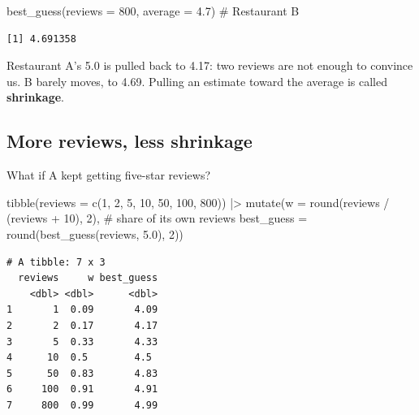 \documentclass[
  letterpaper,
  DIV=11,
  numbers=noendperiod]{scrartcl}
\newenvironment{Shaded}{\begin{snugshade}}{\end{snugshade}}
\newcommand{\AttributeTok}[1]{\textcolor[rgb]{0.40,0.45,0.13}{#1}}
\newcommand{\CommentTok}[1]{\textcolor[rgb]{0.37,0.37,0.37}{#1}}
\newcommand{\DecValTok}[1]{\textcolor[rgb]{0.68,0.00,0.00}{#1}}
\newcommand{\FloatTok}[1]{\textcolor[rgb]{0.68,0.00,0.00}{#1}}
\newcommand{\FunctionTok}[1]{\textcolor[rgb]{0.28,0.35,0.67}{#1}}
\newcommand{\NormalTok}[1]{\textcolor[rgb]{0.00,0.23,0.31}{#1}}
\newcommand{\SpecialCharTok}[1]{\textcolor[rgb]{0.37,0.37,0.37}{#1}}
\begin{document}
\begin{Shaded}
\begin{Highlighting}[]
\FunctionTok{best\_guess}\NormalTok{(}\AttributeTok{reviews =} \DecValTok{800}\NormalTok{, }\AttributeTok{average =} \FloatTok{4.7}\NormalTok{)        }\CommentTok{\# Restaurant B}
\end{Highlighting}
\end{Shaded}

\begin{verbatim}
[1] 4.691358
\end{verbatim}

Restaurant A's 5.0 is pulled back to 4.17: two reviews are not enough to
convince us. B barely moves, to 4.69. Pulling an estimate toward the
average is called \textbf{shrinkage}.

\subsection{More reviews, less
shrinkage}\label{more-reviews-less-shrinkage}

What if A kept getting five-star reviews?

\begin{Shaded}
\begin{Highlighting}[]
\FunctionTok{tibble}\NormalTok{(}\AttributeTok{reviews =} \FunctionTok{c}\NormalTok{(}\DecValTok{1}\NormalTok{, }\DecValTok{2}\NormalTok{, }\DecValTok{5}\NormalTok{, }\DecValTok{10}\NormalTok{, }\DecValTok{50}\NormalTok{, }\DecValTok{100}\NormalTok{, }\DecValTok{800}\NormalTok{)) }\SpecialCharTok{|\textgreater{}}
  \FunctionTok{mutate}\NormalTok{(}\AttributeTok{w          =} \FunctionTok{round}\NormalTok{(reviews }\SpecialCharTok{/}\NormalTok{ (reviews }\SpecialCharTok{+} \DecValTok{10}\NormalTok{), }\DecValTok{2}\NormalTok{),   }\CommentTok{\# share of its own reviews}
         \AttributeTok{best\_guess =} \FunctionTok{round}\NormalTok{(}\FunctionTok{best\_guess}\NormalTok{(reviews, }\FloatTok{5.0}\NormalTok{), }\DecValTok{2}\NormalTok{))}
\end{Highlighting}
\end{Shaded}

\begin{verbatim}
# A tibble: 7 x 3
  reviews     w best_guess
    <dbl> <dbl>      <dbl>
1       1  0.09       4.09
2       2  0.17       4.17
3       5  0.33       4.33
4      10  0.5        4.5 
5      50  0.83       4.83
6     100  0.91       4.91
7     800  0.99       4.99
\end{verbatim}
\end{document}
